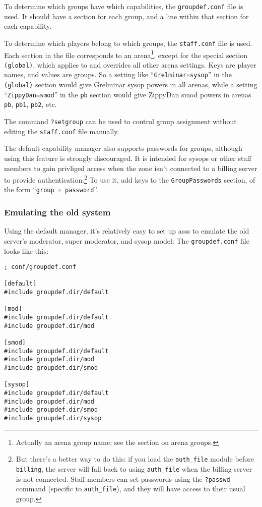 \documentclass{article}
\newcommand{\asss}{asss}
\begin{document}
To determine which groups have which capabilities, the
\verb/groupdef.conf/ file is used. It should have a section for each
group, and a line within that section for each capability.

To determine which players belong to which groups, the \verb/staff.conf/
file is used. Each section in the file corresponds to an
arena\footnote{Actually an arena group name; see the section on arena
groups.}, except for the special section \verb/(global)/, which applies
to and overrides all other arena settings. Keys are player names, and
values are groups. So a setting like ``\verb/Grelminar=sysop/'' in the
\verb/(global)/ section would give Grelminar sysop powers in all arenas,
while a setting ``\verb/ZippyDan=smod/'' in the \verb/pb/ section would
give ZippyDan smod powers in arenas \verb/pb/, \verb/pb1/, \verb/pb2/,
etc.

The command \verb/?setgroup/ can be used to control group assignment
without editing the \verb/staff.conf/ file manually.

The default capability manager also supports passwords for groups,
although using this feature is strongly discouraged. It is intended for
sysops or other staff members to gain privliged access when the zone
isn't connected to a billing server to provide
authentication.\footnote{But there's a better way to do this: if you
load the \texttt{auth\_file} module before \texttt{billing}, the server
will fall back to using \texttt{auth\_file} when the billing server is
not connected. Staff members can set passwords using the
\texttt{?passwd} command (specific to \texttt{auth\_file}), and they
will have access to their usual group.} To use it, add keys to the
\verb/GroupPasswords/ section, of the form ``\verb/group = password/''.


\subsubsection{Emulating the old system}
Using the default manager, it's relatively easy to set up \asss{} to
emulate the old server's moderator, super moderator, and sysop model:
The \verb/groupdef.conf/ file looks like this:

\begin{verbatim}
; conf/groupdef.conf

[default]
#include groupdef.dir/default

[mod]
#include groupdef.dir/default
#include groupdef.dir/mod

[smod]
#include groupdef.dir/default
#include groupdef.dir/mod
#include groupdef.dir/smod

[sysop]
#include groupdef.dir/default
#include groupdef.dir/mod
#include groupdef.dir/smod
#include groupdef.dir/sysop
\end{verbatim}
\end{document}
